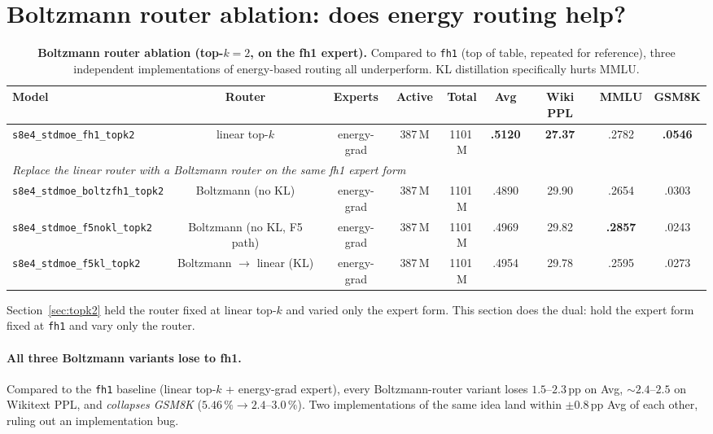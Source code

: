 \documentclass[oneside]{article}
\begin{document}
\section{Boltzmann router ablation: does energy routing help?}
\label{sec:router}

\begin{table}[t]
\centering
\caption{\textbf{Boltzmann router ablation (top-$k=2$, on the fh1 expert).}
Compared to \texttt{fh1} (top of table, repeated for reference), three
independent implementations of energy-based routing all underperform.
KL distillation specifically hurts MMLU.}
\label{tab:router}
\begin{adjustbox}{max width=\textwidth}
\begin{tabular}{l|c|c|cc|c|c|c|c}
\toprule
\textbf{Model} & \textbf{Router} & \textbf{Experts} & \textbf{Active} & \textbf{Total} & \textbf{Avg} & \textbf{Wiki PPL} & \textbf{MMLU} & \textbf{GSM8K} \\
\midrule
\rowcolor{green!15}
\texttt{s8e4\_stdmoe\_fh1\_topk2} & linear top-$k$ & energy-grad & 387\,M & 1101\,M & \textbf{.5120} & \textbf{27.37} & .2782 & \textbf{.0546} \\
\midrule
\multicolumn{9}{l}{\emph{Replace the linear router with a Boltzmann router on the same fh1 expert form}} \\
\texttt{s8e4\_stdmoe\_boltzfh1\_topk2}      & Boltzmann (no KL)            & energy-grad & 387\,M & 1101\,M & .4890 & 29.90 & .2654 & .0303 \\
\texttt{s8e4\_stdmoe\_f5nokl\_topk2}        & Boltzmann (no KL, F5 path)   & energy-grad & 387\,M & 1101\,M & .4969 & 29.82 & \textbf{.2857} & .0243 \\
\texttt{s8e4\_stdmoe\_f5kl\_topk2}          & Boltzmann $\to$ linear (KL)  & energy-grad & 387\,M & 1101\,M & .4954 & 29.78 & .2595 & .0273 \\
\bottomrule
\end{tabular}
\end{adjustbox}
\end{table}

Section~\ref{sec:topk2} held the router fixed at linear top-$k$ and
varied only the expert form. This section does the dual: hold the
expert form fixed at \texttt{fh1} and vary only the router.

\paragraph{All three Boltzmann variants lose to fh1.}
Compared to the \texttt{fh1} baseline (linear top-$k$ + energy-grad
expert), every Boltzmann-router variant loses $1.5$--$2.3$\,pp on
Avg, $\sim$$2.4$--$2.5$ on Wikitext PPL, and \emph{collapses GSM8K}
($5.46\,\%\to 2.4$--$3.0\,\%$). Two implementations of the same idea
land within $\pm 0.8\,$pp Avg of each other, ruling out an
implementation bug.
\end{document}

